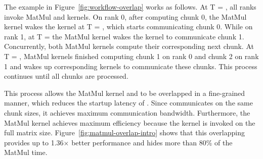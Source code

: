 	

The example in Figure~\ref{fig:workflow-overlap} works as follows.
At T = , all ranks invoke MatMul and \allreduce kernels.
On rank 0, after computing chunk 0, the MatMul kernel wakes the \allreduce kernel at T = , which starts communicating chunk 0.
While on rank 1, at T =  the MatMul kernel wakes the \allreduce kernel to communicate chunk 1.
Concurrently, both MatMul kernels compute their corresponding next chunk.
At T = , MatMul kernels finished computing chunk 1 on rank 0 and chunk 2 on rank 1 and wakes up corresponding \allreduce kernels to communicate these chunks.
This process continues until all chunks are processed.

This process allows the MatMul kernel and \allreduce to be overlapped in a fine-grained manner,
which reduces the startup latency of \allreduce.
Since \allreduce communicates on the same chunk sizes, it achieves maximum communication bandwidth.
Furthermore, the MatMul kernel achieves maximum efficiency because the kernel is invoked on the full matrix size.
Figure~\ref{fig:matmul-overlap-intro} shows that this overlapping provides up to 1.36$\times$ better performance and hides more than 80\% of the MatMul time.

